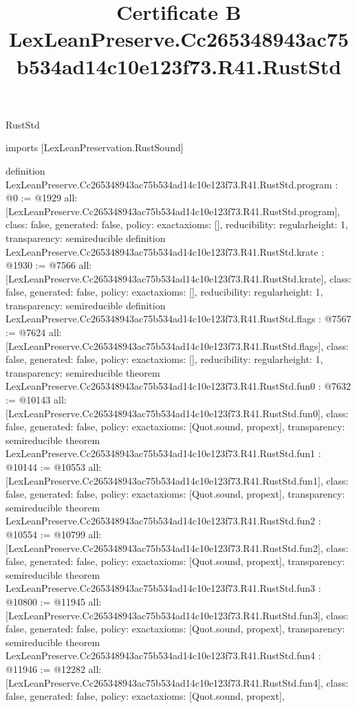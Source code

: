 \begin{lexlean}{RustStd}
\title{Certificate B LexLeanPreserve.Cc265348943ac75b534ad14c10e123f73.R41.RustStd}
\begin{coremodule}
imports [LexLeanPreservation.RustSound]

definition LexLeanPreserve.Cc265348943ac75b534ad14c10e123f73.R41.RustStd.program : @0 := @1929 {
  all: [LexLeanPreserve.Cc265348943ac75b534ad14c10e123f73.R41.RustStd.program],
  class: false,
  generated: false,
  policy: exact{axioms: []},
  reducibility: regular{height: 1},
  transparency: semireducible
}
definition LexLeanPreserve.Cc265348943ac75b534ad14c10e123f73.R41.RustStd.krate : @1930 := @7566 {
  all: [LexLeanPreserve.Cc265348943ac75b534ad14c10e123f73.R41.RustStd.krate],
  class: false,
  generated: false,
  policy: exact{axioms: []},
  reducibility: regular{height: 1},
  transparency: semireducible
}
definition LexLeanPreserve.Cc265348943ac75b534ad14c10e123f73.R41.RustStd.flags : @7567 := @7624 {
  all: [LexLeanPreserve.Cc265348943ac75b534ad14c10e123f73.R41.RustStd.flags],
  class: false,
  generated: false,
  policy: exact{axioms: []},
  reducibility: regular{height: 1},
  transparency: semireducible
}
theorem LexLeanPreserve.Cc265348943ac75b534ad14c10e123f73.R41.RustStd.fun0 : @7632 := @10143 {
  all: [LexLeanPreserve.Cc265348943ac75b534ad14c10e123f73.R41.RustStd.fun0],
  class: false,
  generated: false,
  policy: exact{axioms: [Quot.sound, propext]},
  transparency: semireducible
}
theorem LexLeanPreserve.Cc265348943ac75b534ad14c10e123f73.R41.RustStd.fun1 : @10144 := @10553 {
  all: [LexLeanPreserve.Cc265348943ac75b534ad14c10e123f73.R41.RustStd.fun1],
  class: false,
  generated: false,
  policy: exact{axioms: [Quot.sound, propext]},
  transparency: semireducible
}
theorem LexLeanPreserve.Cc265348943ac75b534ad14c10e123f73.R41.RustStd.fun2 : @10554 := @10799 {
  all: [LexLeanPreserve.Cc265348943ac75b534ad14c10e123f73.R41.RustStd.fun2],
  class: false,
  generated: false,
  policy: exact{axioms: [Quot.sound, propext]},
  transparency: semireducible
}
theorem LexLeanPreserve.Cc265348943ac75b534ad14c10e123f73.R41.RustStd.fun3 : @10800 := @11945 {
  all: [LexLeanPreserve.Cc265348943ac75b534ad14c10e123f73.R41.RustStd.fun3],
  class: false,
  generated: false,
  policy: exact{axioms: [Quot.sound, propext]},
  transparency: semireducible
}
theorem LexLeanPreserve.Cc265348943ac75b534ad14c10e123f73.R41.RustStd.fun4 : @11946 := @12282 {
  all: [LexLeanPreserve.Cc265348943ac75b534ad14c10e123f73.R41.RustStd.fun4],
  class: false,
  generated: false,
  policy: exact{axioms: [Quot.sound, propext]},
}
\end{coremodule}
\end{lexlean}

